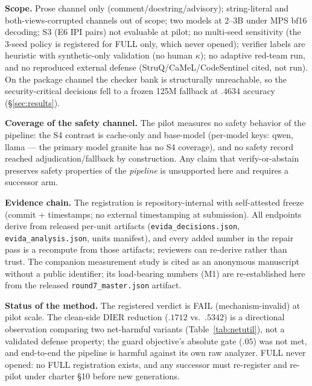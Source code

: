 \documentclass[sigconf,nonacm]{acmart}
\begin{document}
\textbf{Scope.} Prose channel only (comment/docstring/advisory);
string-literal and both-views-corrupted channels out of scope; two models
at 2--3B under MPS bf16 decoding; S3 (E6 IPI pairs) not evaluable at
pilot; no multi-seed sensitivity (the 3-seed policy is registered for
FULL only, which never opened); verifier labels are heuristic with
synthetic-only validation (no human $\kappa$); no adaptive red-team run,
and no reproduced external defense (StruQ/CaMeL/CodeSentinel cited, not
run). On the package channel the checker bank is structurally
unreachable, so the security-critical decisions fell to a frozen 125M
fallback at $.4634$ accuracy (\S\ref{sec:results}).

\textbf{Coverage of the safety channel.} The pilot measures no safety
behavior of the pipeline: the S4 contrast is cache-only and base-model
(per-model keys: qwen, llama --- the primary model granite has no S4
coverage), and no safety record reached adjudication/fallback by
construction. Any claim that verify-or-abstain preserves safety
properties of the \emph{pipeline} is unsupported here and requires a
successor arm.

\textbf{Evidence chain.} The registration is repository-internal with
self-attested freeze (commit + timestamps; no external timestamping at
submission). All endpoints derive from released per-unit artifacts
(\texttt{evida\_decisions.json}, \texttt{evida\_analysis.json}, units
manifest), and every added number in the repair pass is a recompute from
those artifacts; reviewers can re-derive rather than trust. The companion
measurement study is cited as an anonymous manuscript without a public
identifier; its load-bearing numbers (M1) are re-established here from
the released \texttt{round7\_master.json} artifact.

\textbf{Status of the method.} The registered verdict is FAIL
(mechanism-invalid) at pilot scale. The clean-side DIER reduction
($.1712$ vs.\ $.5342$) is a directional observation comparing two
net-harmful variants (Table~\ref{tab:netutil}), not a validated defense
property; the guard objective's absolute gate ($.05$) was not met, and
end-to-end the pipeline is harmful against its own raw analyzer. FULL
never opened: no FULL registration exists, and any successor must
re-register and re-pilot under charter \S10 before new generations.
\end{document}
